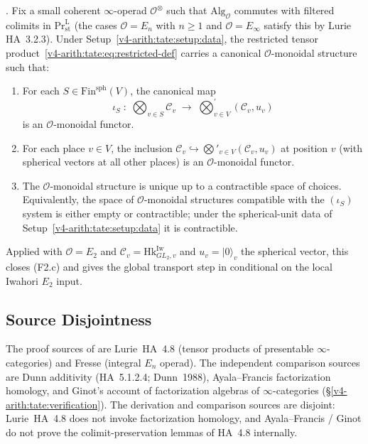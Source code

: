 \begin{theorem}
\label{v4-arith:tate:thm:F2c-main}
\ClaimStatusProvedHere. Fix a small coherent \(\infty\)-operad
\(\mathcal{O}^{\otimes}\) such that \(\mathrm{Alg}_{\mathcal{O}}\)
commutes with filtered colimits in \(\mathrm{Pr}^{\mathrm{L}}_{\mathrm{st}}\)
(the cases \(\mathcal{O}=E_{n}\) with \(n\geq 1\) and \(\mathcal{O}=E_{\infty}\)
satisfy this by Lurie HA~3.2.3). Under Setup~\ref{v4-arith:tate:setup:data},
the restricted tensor product~\eqref{v4-arith:tate:eq:restricted-def}
carries a canonical \(\mathcal{O}\)-monoidal structure such that:
\begin{enumerate}
\item[(M1)] For each \(S\in\mathrm{Fin}^{\mathrm{sph}}(V)\), the
canonical map
\[
\iota_{S}\;:\;\bigotimes_{v\in S}\mathcal{C}_{v}\;\longrightarrow\;\bigotimes_{v\in V}^{\prime}(\mathcal{C}_{v},u_{v})
\]
is an \(\mathcal{O}\)-monoidal functor.
\item[(M2)] For each place \(v\in V\), the inclusion
\(\mathcal{C}_{v}\hookrightarrow\bigotimes'_{v\in V}(\mathcal{C}_{v},u_{v})\)
at position \(v\) (with spherical vectors at all other places) is an
\(\mathcal{O}\)-monoidal functor.
\item[(M3)] The \(\mathcal{O}\)-monoidal structure is unique up to a
contractible space of choices. Equivalently, the space of
\(\mathcal{O}\)-monoidal structures compatible with the \((\iota_{S})\)
system is either empty or contractible; under the spherical-unit
data of Setup~\ref{v4-arith:tate:setup:data} it is contractible.
\end{enumerate}
\end{theorem}

Applied with \(\mathcal{O}=E_{2}\) and
\(\mathcal{C}_{v}=\mathrm{Hk}^{\mathrm{Iw}}_{GL_{2},v}\) and
\(u_{v}=|0\rangle_{v}\) the spherical vector, this closes (F2.c) and
gives the global transport step in 
conditional on the local Iwahori \(E_{2}\) input.

\subsection{Source Disjointness}

The proof sources of  are
Lurie~HA~4.8 (tensor products of presentable \(\infty\)-categories) and
Fresse (integral \(E_{n}\) operad). The independent comparison sources
are Dunn additivity (HA~5.1.2.4; Dunn~1988), Ayala--Francis
factorization homology, and Ginot's account of factorization algebras
of \(\infty\)-categories (\S\ref{v4-arith:tate:verification}). The
derivation and comparison sources are disjoint: Lurie~HA~4.8 does
not invoke factorization homology, and Ayala--Francis / Ginot do not
prove the colimit-preservation lemmas of HA~4.8 internally.

